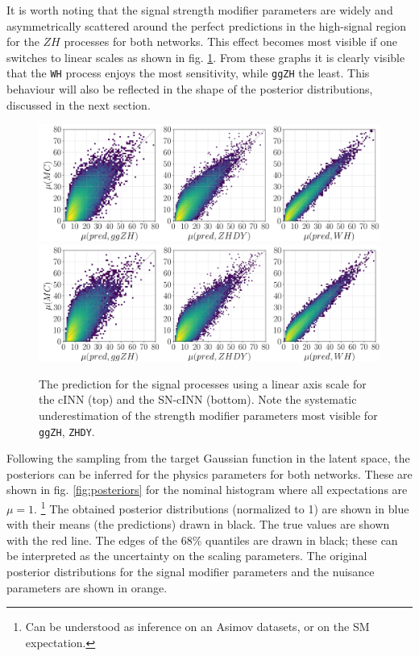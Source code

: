 It is worth noting that the signal strength modifier parameters are widely and asymmetrically scattered around the perfect predictions in the high-signal region for the $ZH$ processes for both networks. This effect becomes most visible if one switches to linear scales as shown in fig. \ref{fig:predictions_sig_lin}. From these graphs it is clearly visible that the \texttt{WH} process enjoys the most sensitivity, while \texttt{ggZH} the least. This behaviour will also be reflected in the shape of the posterior distributions, discussed in the next section.

\begin{figure}[h!]
	\centering
	\includegraphics[width=\linewidth]{figures/inference/p_lin}
	\includegraphics[width=\linewidth]{figures/inference/p_lin_SN}
	\caption{The prediction for the signal processes using a linear axis scale for the cINN (top) and the SN-cINN (bottom). Note the systematic underestimation of the strength modifier parameters most visible for \texttt{ggZH}, \texttt{ZHDY}.}
	\label{fig:predictions_sig_lin}
\end{figure}


Following the sampling from the target Gaussian function in the latent space, the posteriors can be inferred for the physics parameters for both networks. These are shown in fig. \ref{fig:posteriors} for the nominal histogram where all expectations are $\mu=1$. \footnote{Can be understood as inference on an Asimov datasets, or on the SM expectation.} The obtained posterior distributions (normalized to 1) are shown in blue with their means (the predictions) drawn in black. The true values are shown with the red line. The edges of the 68\% quantiles are drawn in black; these can be interpreted as the uncertainty on the scaling parameters. The original posterior distributions for the signal modifier parameters and the nuisance parameters are shown in orange.

